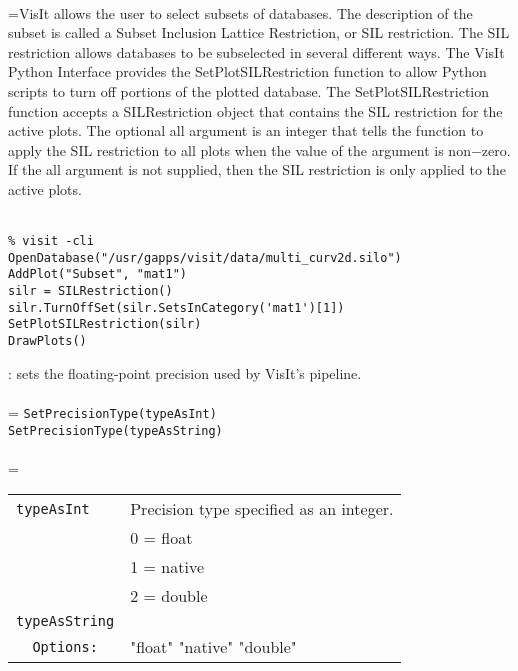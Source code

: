 \documentclass[10pt,a4paper]{report}
\begin{document}
 \\ 
\hangindent=\parindent VisIt allows the user to select subsets of databases. The description of the subset is called a Subset Inclusion Lattice Restriction, or SIL restriction. The SIL restriction allows databases to be subselected in several different ways. The VisIt Python Interface provides the SetPlotSILRestriction function to allow Python scripts to turn off portions of the plotted database. The SetPlotSILRestriction function accepts a SILRestriction object that contains the SIL restriction for the active plots. The optional all argument is an integer that tells the function to apply the SIL restriction to all plots when the value of the argument is non$-$zero. If the all argument is not supplied, then the SIL restriction is only applied to the active plots. \\[-3mm] 

\\[-6mm]
\begin{verbatim}% visit -cli
OpenDatabase("/usr/gapps/visit/data/multi_curv2d.silo")
AddPlot("Subset", "mat1")
silr = SILRestriction()
silr.TurnOffSet(silr.SetsInCategory('mat1')[1])
SetPlotSILRestriction(silr)
DrawPlots()
\end{verbatim}
\newpage


{}
: sets the floating-point precision used by VisIt's pipeline.\\[-3mm]

 \\ 
\hangindent=\parindent 
\verb!SetPrecisionType(typeAsInt)!\\ 
\verb!SetPrecisionType(typeAsString)!\\ [-3mm]

 \\ 
\hangindent=\parindent 
\begin{tabular}{ll}
\verb!typeAsInt! & Precision type specified as an integer. \\
\verb!! & 0 = float \\
\verb!! & 1 = native \\
\verb!! & 2 = double \\
\verb!typeAsString! &  \\
\verb!  Options:! & "float" "native" "double" \\
\end{tabular} \\[-2mm]
\end{document}
